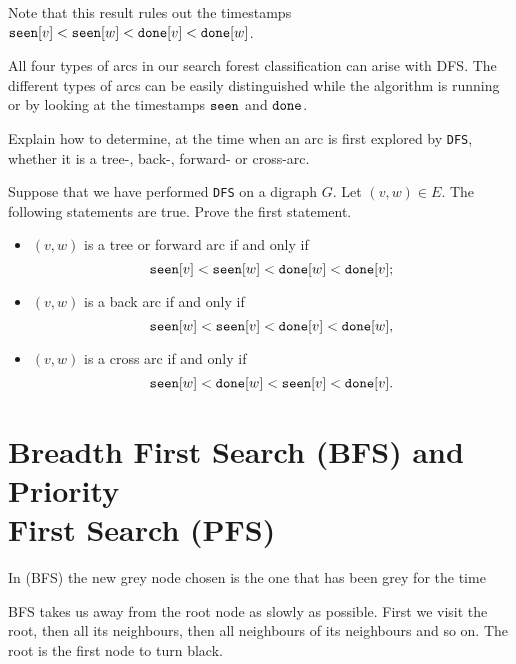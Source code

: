 Note that this result rules out  the timestamps $\operatorname{\text{\texttt{seen}}}[v] < \operatorname{\text{\texttt{seen}}}[w] < \operatorname{\text{\texttt{done}}}[v] < \operatorname{\text{\texttt{done}}}[w]$.

All four types of arcs in our search forest classification can
arise with DFS. The different types of arcs can be easily
distinguished while the algorithm is running or by looking at the timestamps 
$\operatorname{\text{\texttt{seen}}}$ and $\operatorname{\text{\texttt{done}}}$.

\begin{Boxample}[5]
Explain how to determine, at the time when an arc is first explored by
\texttt{DFS}, whether it is a tree-, back-, forward- or cross-arc.
\end{Boxample}

\begin{Boxample}[5] \label{ex:DFS-arc-class}
Suppose that we have performed \texttt{DFS} on a digraph $G$.
 Let $(v, w)\in E$. The following statements are true. Prove the first statement.
\begin{itemize}
  \item $(v, w)$ is a tree or forward arc if and only if  
	$$\operatorname{\text{\texttt{seen}}}[v] < \operatorname{\text{\texttt{seen}}}[w] < \operatorname{\text{\texttt{done}}}[w] < \operatorname{\text{\texttt{done}}}[v]\text{;}$$
  \item $(v, w)$ is a back arc if and only if
	$$\operatorname{\text{\texttt{seen}}}[w] <  \operatorname{\text{\texttt{seen}}}[v] < \operatorname{\text{\texttt{done}}}[v] < \operatorname{\text{\texttt{done}}}[w]\text{,}$$ 
  \item $(v, w)$ is a cross arc if and only if 
	$$\operatorname{\text{\texttt{seen}}}[w] < \operatorname{\text{\texttt{done}}}[w]  < \operatorname{\text{\texttt{seen}}}[v] < \operatorname{\text{\texttt{done}}}[v]\text{.}$$
\end{itemize}
\end{Boxample}



\chapter{Breadth First Search (BFS) and Priority\\ First Search (PFS)} %
\begin{Definition}
In  (BFS) the new grey node chosen is the one
that has been grey for the  time
\end{Definition}
 
BFS takes us away from the root node as slowly as possible. 
First we visit the root, then all its neighbours, then all neighbours of its neighbours and so on. 
The root is the first node to turn black.


